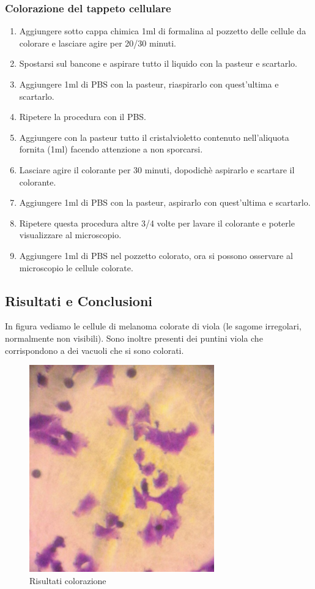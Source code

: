 \subsubsection{Colorazione del tappeto cellulare}

\begin{enumerate}
    \item Aggiungere sotto cappa chimica 1ml di formalina al pozzetto delle cellule da
    colorare e lasciare agire per 20/30 minuti.
    \item Spostarsi sul bancone e aspirare tutto il liquido con la pasteur e scartarlo.
    \item Aggiungere 1ml di PBS con la pasteur, riaspirarlo con quest'ultima e scartarlo.
    \item Ripetere la procedura con il PBS.
    \item Aggiungere con la pasteur tutto il cristalvioletto contenuto nell'aliquota fornita
    (1ml) facendo attenzione a non sporcarsi.
    \item Lasciare agire il colorante per 30 minuti, dopodich\`e aspirarlo e scartare il colorante.
    \item Aggiungere 1ml di PBS con la pasteur, aspirarlo con quest'ultima e scartarlo.
    \item Ripetere questa procedura altre 3/4 volte per lavare il colorante e poterle visualizzare
    al microscopio.
    \item Aggiungere 1ml di PBS nel pozzetto colorato, ora si possono osservare al
    microscopio le cellule colorate.
\end{enumerate}

\subsection{Risultati e Conclusioni}

In figura vediamo le cellule di melanoma colorate di viola (le sagome irregolari, normalmente non visibili).
Sono inoltre presenti dei puntini viola che corrispondono a dei vacuoli che si sono colorati.

\begin{figure}[htbp]
	\centering
	\includegraphics[width=80mm]{./immagini/melanoma.png}
	\caption{Risultati colorazione}
	\label{melanoma}
\end{figure}
